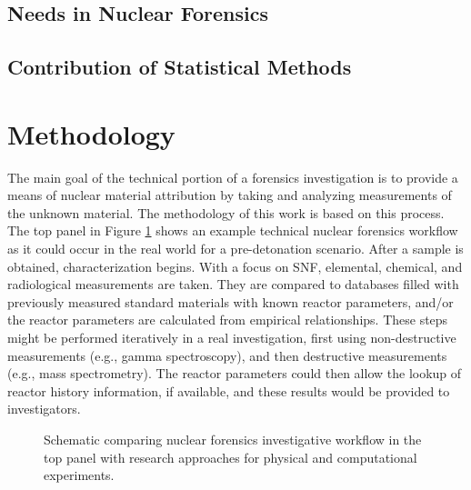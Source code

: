 \subsection{Needs in Nuclear Forensics}

\label{sec:nfneeds}

\subsection{Contribution of Statistical Methods}

\label{sec:statscontrib}

\section{Methodology}
\label{sec:methodology}

The main goal of the technical portion of a forensics investigation is to
provide a means of nuclear material attribution by taking and analyzing
measurements of the unknown material.  The methodology of this work is based on
this process. The top panel in Figure \ref{fig:nfworkflows} shows an example
technical nuclear forensics workflow as it could occur in the real world for a
pre-detonation scenario.  After a sample is obtained, characterization begins.
With a focus on \gls{SNF}, elemental, chemical, and radiological measurements
are taken.  They are compared to databases filled with previously measured
standard materials with known reactor parameters, and/or the reactor parameters
are calculated from empirical relationships.  These steps might be performed
iteratively in a real investigation, first using non-destructive measurements
(e.g., gamma spectroscopy), and then destructive measurements (e.g., mass
spectrometry).  The reactor parameters could then allow the lookup of reactor
history information, if available, and these results would be provided to
investigators. 

\begin{figure}[!tbh]
  \caption[Comparison of nuclear forensics workflow against research approaches]
          {Schematic comparing nuclear forensics investigative workflow in the 
          top panel with research approaches for physical and computational 
          experiments.}
  \label{fig:nfworkflows}
\end{figure}

